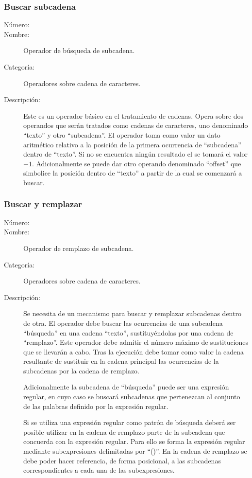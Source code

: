 \subsubsection{Buscar subcadena}
\begin{framed}
	\begin{description}
		\item [Número:] \cn
		\item [Nombre:] Operador de búsqueda de subcadena.
		\item [Categoría:] Operadores sobre cadena de caracteres.
		\item [Descripción:] Este es un operador básico en el tratamiento de cadenas. Opera sobre dos operandos
		que serán tratados como cadenas de caracteres, uno denominado ``texto'' y otro ``subcadena''. El operador
		toma como valor un dato aritmético relativo a la posición de la primera ocurrencia de ``subcadena'' dentro
		de ``texto''. Si no se encuentra ningún resultado el se tomará el valor $-1$. Adicionalmente se puede dar otro
		operando denominado ``offset'' que simbolice la posición dentro de ``texto'' a partir de la cual se comenzará
		a buscar.
	\end {description}
\end{framed}

\subsubsection{Buscar y remplazar}
\begin{framed}
	\begin{description}
		\item [Número:] \cn
		\item [Nombre:] Operador de remplazo de subcadena.
		\item [Categoría:] Operadores sobre cadena de caracteres.
		\item [Descripción:] Se necesita de un mecanismo para buscar y remplazar subcadenas dentro de otra.
		El operador debe buscar las ocurrencias de una subcadena ``búsqueda'' en una
		cadena ``texto'', sustituyéndolas por una cadena de ``remplazo''. Este operador debe admitir
		el número máximo de sustituciones que se llevarán a cabo. Tras la ejecución debe tomar como valor la cadena
		resultante de sustituir en la cadena principal las ocurrencias de la subcadenas por la cadena de remplazo.

		Adicionalmente la subcadena de ``búsqueda'' puede ser una expresión regular, en cuyo caso
		se buscará subcadenas que pertenezcan al conjunto de las palabras definido por la
		expresión regular.
		
		Si se utiliza una expresión regular como patrón de búsqueda deberá ser posible
		utilizar en la cadena de remplazo parte de la subcadena
		que concuerda con la expresión regular. Para ello se forma la expresión regular mediante
		subexpresiones delimitadas por ``()''. En la cadena de remplazo se debe poder hacer referencia,
		de forma posicional, a las subcadenas correspondientes a cada una de las subexpresiones.
	\end {description}
\end{framed}

